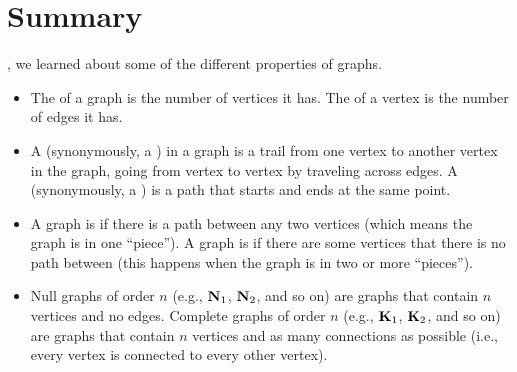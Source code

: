 \documentclass[../../../main.tex]{subfiles}
\begin{document}
\section{Summary}

, we learned about some of the different properties of graphs.

\begin{itemize}

  \item The  of a graph is the number of vertices it has. The  of a vertex is the number of edges it has.
  
  \item A  (synonymously, a ) in a graph is a trail from one vertex to another vertex in the graph, going from vertex to vertex by traveling across edges. A  (synonymously, a ) is a path that starts and ends at the same point.
  
  \item A graph is  if there is a path between any two vertices (which means the graph is in one ``piece''). A graph is  if there are some vertices that there is no path between (this happens when the graph is in two or more ``pieces''). 
  
  \item Null graphs of order $n$ (e.g., $\mathbf{N}_{1}$, $\mathbf{N}_{2}$, and so on) are graphs that contain $n$ vertices and no edges. Complete graphs of order $n$ (e.g., $\mathbf{K}_{1}$, $\mathbf{K}_{2}$, and so on) are graphs that contain $n$ vertices and as many connections as possible (i.e., every vertex is connected to every other vertex). 

\end{itemize}
\end{document}
